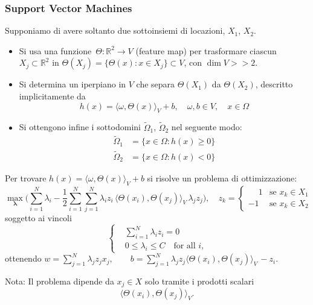 \documentclass[10pt]{beamer}
\theoremstyle{definition}
\theoremstyle{plain}
\def\R{\mathbb R}
\begin{document}
\begin{frame}
\frametitle{Support Vector Machines}
Supponiamo di avere soltanto due sottoinsiemi di locazioni, $X_1$, $X_2$.
\begin{itemize}
\item Si usa una funzione~$\Theta:\R^2\to V$ (\alert{feature map}) per trasformare ciascun $X_j\subset\R^2$ in $\Theta(X_j) = \{\Theta(x):x\in X_j\}\subset V$, con $\dim V >> 2$.
\item Si determina un iperpiano in $V$ che separa $\Theta(X_1)$ da $\Theta(X_2)$, descritto implicitamente da
$$
h(x) = \langle \omega, \Theta(x) \rangle_V + b, \quad \omega, b\in V, \quad x\in\Omega
$$
\item Si ottengono infine i sottodomini $\widetilde\Omega_1$, $\widetilde\Omega_2$ nel seguente modo:
$$
\begin{aligned}
\widetilde\Omega_1 &= \{x\in \Omega : h(x) \geq 0\}\\
\widetilde\Omega_2 &= \{x\in \Omega : h(x) < 0\}
\end{aligned}
$$
\end{itemize}
\end{frame}


\begin{frame}
Per trovare $h(x) = \langle \omega, \Theta(x) \rangle_V + b$ si risolve un problema di ottimizzazione:
$$
\max_{\bm \lambda}\biggl(\sum_{i=1}^N\lambda_i - {\frac12}\sum_{i=1}^N\sum_{j=1}^N\lambda_i z_i\,\langle \Theta(x_i), \Theta(x_j)\rangle_V\, \lambda_j z_j\biggr), \quad z_k = \begin{cases}\phantom-1 & \text{se $x_k\in X_1$}\\
			-1 & \text{se $x_k\in X_2$}
\end{cases}
$$
soggetto ai vincoli
$$
\left\{\begin{aligned}&\textstyle\sum_{i=1}^N\lambda_i z_i = 0\\
                & 0\leq\lambda_i\leq C\quad\text{for all~$i$,}\end{aligned}\right.
$$
ottenendo $w = \sum_{j=1}^N \lambda_j z_j x_j, \qquad b =\sum_{j=1}^N\lambda_j z_j\langle \Theta(x_i), \Theta(x_j)\rangle_V\, - z_i$.


\bigskip

\alert{Nota}: Il problema dipende da $x_j\in X$ solo tramite i prodotti scalari 
$$\langle \Theta(x_i), \Theta(x_j)\rangle_V.$$
\end{frame}
\end{document}
